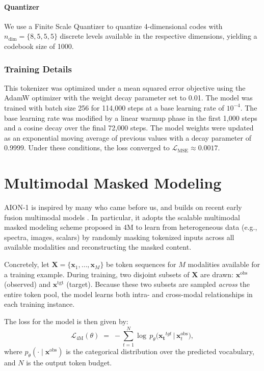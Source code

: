 \documentclass[]{polymathic}
\begin{document}
\paragraph{Quantizer} We use a Finite Scale Quantizer \citep{mentzer2023finite} to quantize 4-dimensional codes with $n_{\text{dim}}=\{8, 5, 5, 5\}$ discrete levels available in the respective dimensions, yielding a codebook size of 1000.

\subsubsection{Training Details}

This tokenizer was optimized under a mean squared error objective using the AdamW optimizer with the weight decay parameter set to 0.01. The model was trained with batch size 256 for 114,000 steps at a base learning rate of $10^{-4}$. The base learning rate was modified by a linear warmup phase in the first 1,000 steps and a cosine decay over the final 72,000 steps. The model weights were updated as an exponential moving average of previous values with a decay parameter of 0.9999. Under these conditions, the loss converged to $\mathcal{L}_{\text{MSE}} \approx 0.0017$.


\section{Multimodal Masked Modeling}
AION-1 is inspired by many who came before us, and builds on recent early fusion multimodal models \citep{chameleonteam, perceiverio,imagebind}. In particular, it adopts the scalable multimodal masked modeling scheme proposed in 4M \citep{mizrahi20234m, 4m-21} to learn from heterogeneous data (e.g., spectra, images, scalars) by randomly masking tokenized inputs across all available modalities and reconstructing the masked content. 

Concretely, let \(\mathbf{X} = \{\mathbf{x}_1, \ldots, \mathbf{x}_M\}\) be token sequences for \(M\) modalities available for a training example. 
During training, two disjoint subsets of $\mathbf{X}$ are drawn: \(\mathbf{x}^{\mathrm{obs}}\) (observed) and \(\mathbf{x}^{\mathrm{tgt}}\) (target). Because these two subsets are sampled \emph{across} the entire token pool, the model learns both intra- and cross-modal relationships in each training instance.

The loss for the model is then given by:
\begin{equation}
        \mathcal{L}_{\mathrm{4M}}(\theta)
   \;=\;
    -\sum_{t=1}^{N} \log\,p_\theta\bigl(\mathbf{x_t}^{tgt} \,\big\vert\, \mathbf{x}_t^{\mathrm{obs}}\bigr),
\end{equation}
where \(p_\theta(\cdot \mid \mathbf{x}^{\mathrm{obs}})\) is the categorical distribution over the predicted vocabulary, and $N$ is the output token budget. 
\end{document}
